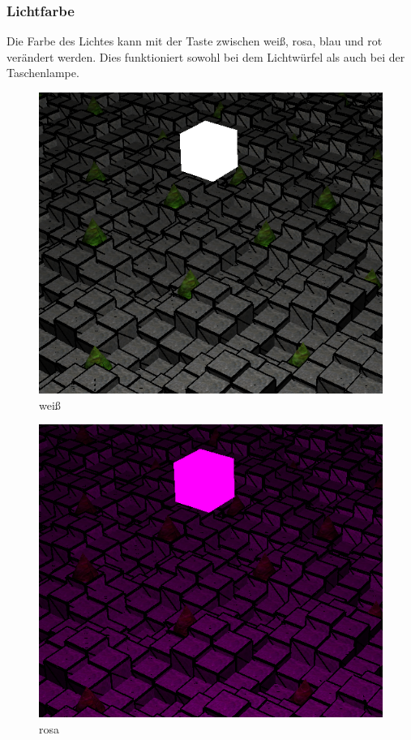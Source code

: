 \documentclass{article}
\begin{document}
\subsubsection{Lichtfarbe}
Die Farbe des Lichtes kann mit der Taste  zwischen weiß, rosa, blau und rot verändert werden.
Dies funktioniert sowohl bei dem Lichtwürfel als auch bei der Taschenlampe.\\
\begin{minipage}{0.5\textwidth}
\begin{minipage}{0.485\textwidth}
\begin{figure}[H]
    \includegraphics[scale=0.2]{lcolor1.png}
    \caption{weiß}
\end{figure}
\end{minipage}
\begin{minipage}{0.25\textwidth}
\begin{figure}[H]
    \includegraphics[scale=0.215]{lcolor2.png}
    \caption{rosa}
\end{figure}
\end{minipage}
\end{minipage}
\end{document}
